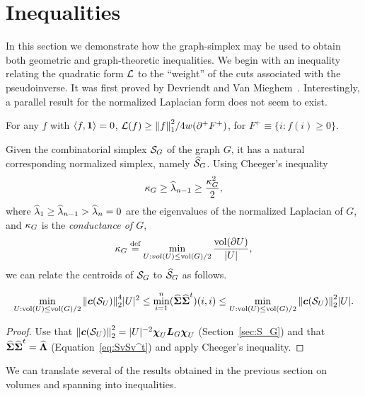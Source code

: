 \section{Inequalities}
\label{sec:inequalities}
In this section we demonstrate how the graph-simplex may be used to obtain both geometric and graph-theoretic inequalities. We begin with an inequality relating the quadratic form $\mathcal{L}$ to the ``weight'' of the cuts associated with the pseudoinverse.  It was first proved by Devriendt and Van Mieghem~\cite{devriendt2018simplex}. Interestingly, a parallel result for the normalized Laplacian form does not seem to exist. 
 
\begin{lemma}
	\label{lem:ineq_f1}
For any $f$ with $\langle f,\vb{1}\rangle=0$, $
\mathcal{L}(f) \geq \norm{f}_1^2/4w(\partial^+F^+)$, 
for $F^+\equiv \{i:f(i)\geq 0\}$. 
\end{lemma}

Given the combinatorial simplex $\mathcal{S}_G$ of the  graph $G$, it has a natural corresponding normalized simplex, namely $\widehat{\mathcal{S}}_G$. Using Cheeger's inequality~\cite{chung1997spectral}
\begin{equation*}
\kappa_G \geq \widehat{\lambda}_{n-1} \geq \frac{\kappa_G^2}{2},
\end{equation*}  
where  $\widehat{\lambda}_1\geq \widehat{\lambda}_{n-1}>\widehat{\lambda}_n=0$ are the eigenvalues of the normalized Laplacian of  $G$, and $\kappa_G$ is the \emph{conductance of $G$}, 
\begin{equation*}
\kappa_G\overset{\text{def}}{=} \min_{U:vol(U)\leq \textnormal{vol}(G)/2} \frac{\textnormal{vol}(\partial U)}{|U|},
\end{equation*}
we can  relate  the centroids of $\mathcal{S}_G$ to $\widehat{\mathcal{S}}_G$ as follows. 

\begin{observation}
	\begin{equation*}
	\min_{U:\textnormal{vol}(U)\leq \textnormal{vol}(G)/2} \norm{\vb*{c}(\mathcal{S}_U)}_2^4 |U|^2  \leq \min_{i=1}^n (\widehat{\boldsymbol{\Sigma}}\widehat{\boldsymbol{\Sigma}}^t)(i,i) \leq \min_{U:\textnormal{vol}(U)\leq \textnormal{vol}(G)/2} \norm{\vb*{c}(\mathcal{S}_U)}_2^2 |U|.  
	\end{equation*}
\end{observation}
\begin{proof}
	Use that $\norm{\vb*{c}(\mathcal{S}_U)}_2^2 =  |U|^{-2} \boldsymbol{\chi}_U\vb*{L}_G\boldsymbol{\chi}_U$ (Section~\ref{sec:S_G}) and that $\widehat{\boldsymbol{\Sigma}}\widehat{\boldsymbol{\Sigma}}^t=\widehat{\vb{\Lambda}}$ (Equation~\eqref{eq:SvSv^t}) and apply Cheeger's inequality. 
\end{proof}

We can translate several of the results obtained in the previous section on  volumes and spanning  into inequalities. 

